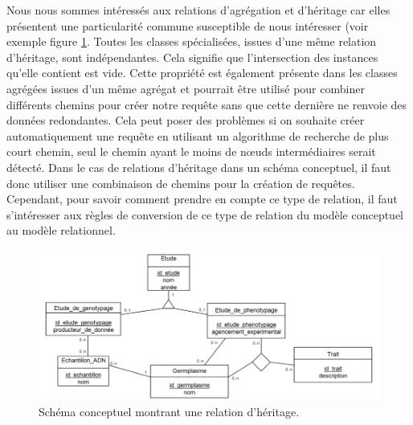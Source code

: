 Nous nous sommes intéressés aux relations d'agrégation et d'héritage car elles présentent une particularité commune susceptible de nous intéresser (voir exemple figure \ref{heritage}. Toutes les classes spécialisées, issues d'une même relation d'héritage, sont indépendantes. Cela signifie que l'intersection des instances qu'elle contient est vide. Cette propriété est également présente dans les classes agrégées issues d'un même agrégat et pourrait être utilisé pour combiner différents chemins pour créer notre requête sans que cette dernière ne renvoie des données redondantes.  Cela peut poser des problèmes si on souhaite créer automatiquement une requête en utilisant un algorithme de recherche de plus court chemin, seul le chemin ayant le moins de nœuds intermédiaires serait détecté.
Dans le cas de relations d'héritage dans un schéma conceptuel, il faut donc utiliser une combinaison de chemins pour la création de requêtes. Cependant, pour savoir comment prendre en compte ce type de relation, il faut s'intéresser aux règles de conversion de ce type de relation du modèle conceptuel au modèle relationnel.

\begin{figure}[!ht]
\begin{center}
	\includegraphics[width=1\textwidth]{Figures/biosemantic1.png}
\end{center}
\caption{\label{heritage} Schéma conceptuel montrant une relation d'héritage.}
\end{figure}

